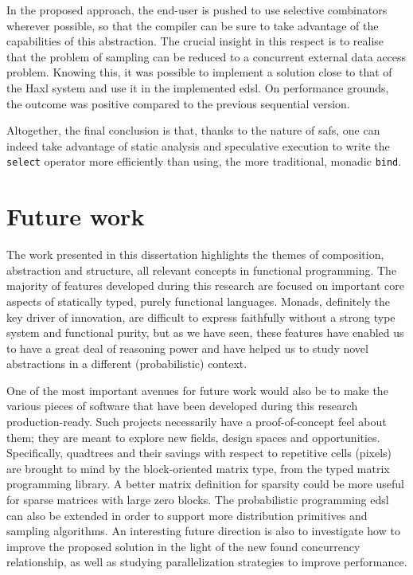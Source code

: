 \documentclass[
  oneside,
  11pt, a4paper,
  footinclude=true,
  headinclude=true,
  cleardoublepage=empty
]{scrbook}
\theoremstyle{definition}
\theoremstyle{definition}
\begin{document}
	        In the proposed approach, the end-user is pushed to use selective combinators wherever possible, so that the compiler can be sure to take advantage of the capabilities of this abstraction. The crucial insight in this respect is to realise that the problem of sampling can be reduced to a concurrent external data access problem. Knowing this, it was possible to implement a solution close to that of the Haxl system and use it in the implemented \gls{edsl}. On performance grounds, the outcome was positive compared to the previous sequential version.
	        
	        Altogether, the final conclusion is that, thanks to the nature of \glspl{saf}, one can indeed take advantage of static analysis and speculative execution to write the \texttt{select} operator more efficiently than using, the more traditional, monadic \texttt{bind}.
	        
	    \section{Future work}
	    
	     The work presented in this dissertation highlights the themes of composition, abstraction and structure, all relevant concepts in functional programming. The majority of features developed during this research are focused on important core aspects of statically typed, purely functional languages. Monads, definitely the key driver of innovation, are difficult to express faithfully without a strong type system and functional purity, but as we have seen, these features have enabled us to have a great deal of reasoning power and have helped us to study novel abstractions in a different (probabilistic) context.
	    
	     One of the most important avenues for future work would also be to make the various pieces of software that have been developed during this research production-ready. Such projects necessarily have a proof-of-concept feel about them; they are meant to explore new fields, design spaces and opportunities. Specifically, quadtrees \citep{samet1984quadtree} and their savings with respect to repetitive cells (pixels) are brought to mind by the block-oriented matrix type, from the typed matrix programming library. A better matrix definition for sparsity could be more useful for sparse matrices with large zero blocks. The probabilistic programming \gls{edsl} can also be extended in order to support more distribution primitives and sampling algorithms. An interesting future direction is also to investigate how to improve the proposed solution in the light of the new found concurrency relationship, as well as studying parallelization strategies to improve performance. 
	     
\end{document}
